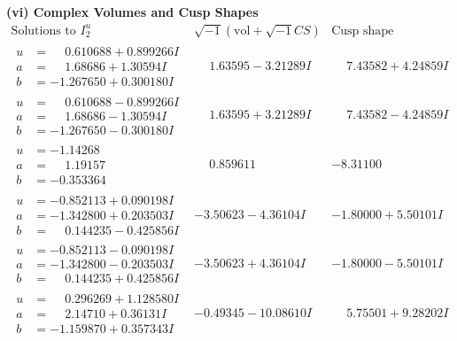 \documentclass[1p]{elsarticle_modified}
\theoremstyle{definition}
\newcommand{\I}{\sqrt{-1}}
\begin{document}
\newpage\flushleft \textbf{(vi) Complex Volumes and Cusp Shapes}
$$\begin{array}{c|c|c}  
\text{Solutions to }I^u_{2}& \I (\text{vol} + \sqrt{-1}CS) & \text{Cusp shape}\\
 \hline 
\begin{aligned}
u &= \phantom{-}0.610688 + 0.899266 I \\
a &= \phantom{-}1.68686 + 1.30594 I \\
b &= -1.267650 + 0.300180 I\end{aligned}
 & \phantom{-}1.63595 - 3.21289 I & \phantom{-}7.43582 + 4.24859 I \\ \hline\begin{aligned}
u &= \phantom{-}0.610688 - 0.899266 I \\
a &= \phantom{-}1.68686 - 1.30594 I \\
b &= -1.267650 - 0.300180 I\end{aligned}
 & \phantom{-}1.63595 + 3.21289 I & \phantom{-}7.43582 - 4.24859 I \\ \hline\begin{aligned}
u &= -1.14268\phantom{ +0.000000I} \\
a &= \phantom{-}1.19157\phantom{ +0.000000I} \\
b &= -0.353364\phantom{ +0.000000I}\end{aligned}
 & \phantom{-}0.859611\phantom{ +0.000000I} & -8.31100\phantom{ +0.000000I} \\ \hline\begin{aligned}
u &= -0.852113 + 0.090198 I \\
a &= -1.342800 + 0.203503 I \\
b &= \phantom{-}0.144235 - 0.425856 I\end{aligned}
 & -3.50623 - 4.36104 I & -1.80000 + 5.50101 I \\ \hline\begin{aligned}
u &= -0.852113 - 0.090198 I \\
a &= -1.342800 - 0.203503 I \\
b &= \phantom{-}0.144235 + 0.425856 I\end{aligned}
 & -3.50623 + 4.36104 I & -1.80000 - 5.50101 I \\ \hline\begin{aligned}
u &= \phantom{-}0.296269 + 1.128580 I \\
a &= \phantom{-}2.14710 + 0.36131 I \\
b &= -1.159870 + 0.357343 I\end{aligned}
 & -0.49345 - 10.08610 I & \phantom{-}5.75501 + 9.28202 I \\ \hline\begin{aligned}

\end{aligned}
\end{array}$$
\end{document}
